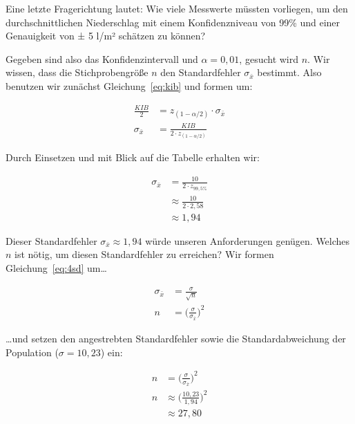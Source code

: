 \documentclass[
  11pt,
  ngerman,
  a4paper,
]{report}
\begin{document}
Eine letzte Fragerichtung lautet: Wie viele Messwerte müssten vorliegen, um den durchschnittlichen Niederschlag mit einem Konfidenzniveau von 99\% und einer Genauigkeit von ± 5 l/m² schätzen zu können?

Gegeben sind also das Konfidenzintervall und \(\alpha=0{,}01\), gesucht wird \(n\). Wir wissen, dass die Stichprobengröße \(n\) den Standardfehler \(\sigma_{\bar{x}}\) bestimmt. Also benutzen wir zunächst Gleichung~\eqref{eq:kib} und formen um:

\nopagebreak

\[\begin{aligned}
\frac{\mathit{KIB}}{2} &= z_{(1-\alpha/2)} \cdot \sigma_{\bar{x}}\\[4pt]
\sigma_{\bar{x}} &= \frac{\mathit{KIB}}{2\cdot z_{(1-\alpha/2)}} 
\end{aligned}\]

Durch Einsetzen und mit Blick auf die Tabelle erhalten wir:

\nopagebreak

\[\begin{aligned}
\sigma_{\bar{x}} &= \frac{10}{2\cdot z_{99{,}5\%}}\\[4pt]
 &\approx \frac{10}{2\cdot 2{,}58}\\[4pt]
 &\approx 1{,}94
\end{aligned}\]

Dieser Standardfehler \(\sigma_{\bar{x}}\approx1{,}94\) würde unseren Anforderungen genügen. Welches \(n\) ist nötig, um diesen Standardfehler zu erreichen? Wir formen Gleichung~\eqref{eq:4sd} um\ldots{}

\nopagebreak

\[\begin{aligned}
\sigma_{\bar{x}} &= \frac{\sigma}{\sqrt{n}}\\[4pt]
               n &= \Big(\frac{\sigma}{\sigma_{\bar{x}}}\Big)^2
\end{aligned}\]

\ldots und setzen den angestrebten Standardfehler sowie die Standardabweichung der Population (\(\sigma=10{,}23\)) ein:

\nopagebreak

\[
\begin{aligned}
n&=\Big(\frac{\sigma}{\sigma_{\bar{x}}}\Big)^2\\[4pt]
n&\approx\bigg(\frac{10{,}23}{1{,}94}\bigg)^2\\[4pt]
&\approx27{,}80
\end{aligned}
\]
\end{document}
